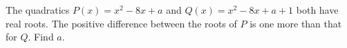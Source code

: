 The quadratics $P(x)=x^2-8x+a$ and $Q(x)=x^2-8x+a+1$ both have real roots. The positive difference between the roots of $P$ is one more than that for $Q$. Find $a$.
